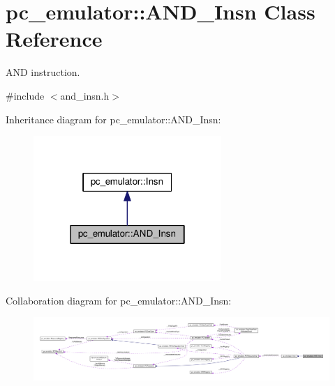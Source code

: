 \hypertarget{classpc__emulator_1_1AND__Insn}{}\section{pc\+\_\+emulator\+:\+:A\+N\+D\+\_\+\+Insn Class Reference}
\label{classpc__emulator_1_1AND__Insn}


A\+ND instruction.  




{\ttfamily \#include $<$and\+\_\+insn.\+h$>$}



Inheritance diagram for pc\+\_\+emulator\+:\+:A\+N\+D\+\_\+\+Insn\+:\nopagebreak
\begin{figure}[H]
\begin{center}
\leavevmode
\includegraphics[width=202pt]{classpc__emulator_1_1AND__Insn__inherit__graph}
\end{center}
\end{figure}


Collaboration diagram for pc\+\_\+emulator\+:\+:A\+N\+D\+\_\+\+Insn\+:\nopagebreak
\begin{figure}[H]
\begin{center}
\leavevmode
\includegraphics[width=350pt]{classpc__emulator_1_1AND__Insn__coll__graph}
\end{center}
\end{figure}
